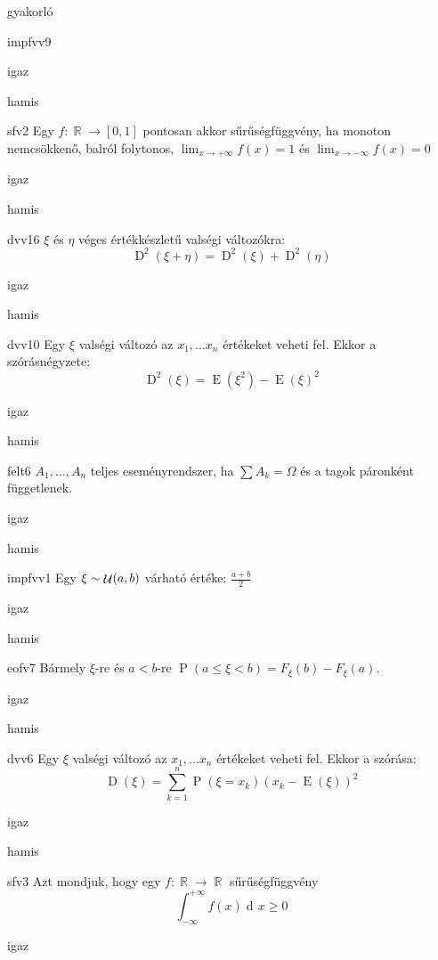 \documentclass[12pt]{article}
\DeclareMathOperator{\E}{E}
\DeclareMathOperator{\D}{D}
\renewcommand{\P}{\operatorname{P}}
\renewcommand{\d}{\operatorname{d\! }} %
\DeclareMathOperator{\R}{\mathbb{R}}
\DeclareMathOperator{\Unif}{{\cal U}}
\begin{document}
\begin{quiz}{gyakorló}
\begin{multi}{impfvv9}
$$$$
\item* igaz
\item hamis
\end{multi}
\begin{multi}{sfv2}
Egy $f:\R\to [0,1]$ pontosan akkor sűrűségfüggvény, ha monoton nemcsökkenő, 
balról folytonos, $\lim_{x\to+\infty}f(x)=1$ és $\lim_{x\to-\infty}f(x)=0$
\item igaz
\item* hamis
\end{multi}
\begin{multi}{dvv16}
$\xi$ és $\eta$ véges értékkészletű valségi változókra:
$$
\D^2(\xi+\eta)=\D^2(\xi)+\D^2(\eta)
$$
\item igaz
\item* hamis
\end{multi}
\begin{multi}{dvv10}
Egy $\xi$ valségi változó az $x_1,\ldots x_n$ értékeket veheti fel. 
Ekkor a szórásnégyzete:
$$
\D^2(\xi)=\E(\xi^2)-\E(\xi)^2
$$
\item* igaz
\item hamis
\end{multi}
\begin{multi}{felt6}
$A_1,\ldots,A_n$ teljes eseményrendszer, ha $\sum A_k=\Omega$ és a tagok páronként függetlenek.
\item igaz
\item* hamis
\end{multi}
\begin{multi}{impfvv1}
Egy $\xi\sim \Unif(a,b)$ várható értéke: $\frac{a+b}{2}$
\item* igaz
\item hamis
\end{multi}
\begin{multi}{eofv7}
Bármely $\xi$-re és $a<b$-re $\P(a\le \xi <b)=F_{\xi}(b)-F_{\xi}(a)$.
\item* igaz
\item hamis
\end{multi}
\begin{multi}{dvv6}
Egy $\xi$ valségi változó az $x_1,\ldots x_n$ értékeket veheti fel. Ekkor a szórása:
$$
\D(\xi)=\sum_{k=1}^n \P(\xi=x_k)(x_k-\E(\xi))^2
$$
\item igaz
\item* hamis
\end{multi}
\begin{multi}{sfv3}
Azt mondjuk, hogy egy $f:\R\to \R$ sűrűségfüggvény 
$$
\int_{-\infty}^{+\infty}f(x)\d x\ge 0
$$
\item igaz

\end{multi}
\end{quiz}
\end{document}

